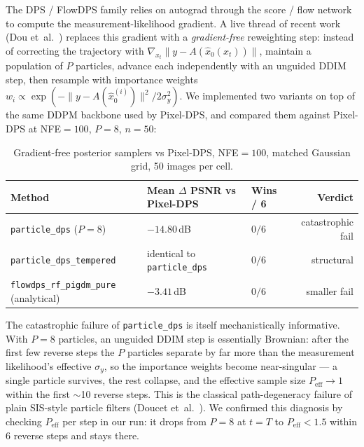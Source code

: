 \documentclass{article}
\begin{document}
The DPS / FlowDPS family relies on autograd through the score / flow
network to compute the measurement-likelihood gradient. A live thread
of recent work (Dou et~al.~\cite{dou2026particle}) replaces this
gradient with a \emph{gradient-free} reweighting step:
instead of correcting the trajectory with
$\nabla_{x_t} \| y - A(\hat x_0(x_t)) \|$, maintain a population of
$P$ particles, advance each independently with an unguided DDIM step,
then resample with importance weights
$w_i \propto \exp(-\| y - A(\hat x_0^{(i)}) \|^2 / 2\sigma_y^2)$.
We implemented two variants on top of the same DDPM backbone used by
Pixel-DPS, and compared them against Pixel-DPS at NFE${=}100$,
$P{=}8$, $n{=}50$:

\begin{table}[h]
  \centering
  \caption{Gradient-free posterior samplers vs Pixel-DPS, NFE${=}100$,
  matched Gaussian grid, 50 images per cell.}
  \label{tab:gradfree}
  \begin{tabular}{lllr}
    \toprule
    Method & Mean $\Delta$ PSNR vs Pixel-DPS & Wins / 6 & Verdict \\
    \midrule
    \texttt{particle\_dps} ($P{=}8$)            & $-14.80$\,dB & $0/6$ & catastrophic fail \\
    \texttt{particle\_dps\_tempered}            & identical to \texttt{particle\_dps} & $0/6$ & structural \\
    \texttt{flowdps\_rf\_pigdm\_pure} (analytical) & $-3.41$\,dB & $0/6$ & smaller fail \\
    \bottomrule
  \end{tabular}
\end{table}

The catastrophic failure of \texttt{particle\_dps} is itself
mechanistically informative. With $P{=}8$ particles, an unguided
DDIM step is essentially Brownian: after the first few reverse steps
the $P$ particles separate by far more than the measurement
likelihood's effective $\sigma_y$, so the importance weights become
near-singular --- a single particle survives, the rest collapse, and
the effective sample size $P_\text{eff} \to 1$ within the first
$\sim$10 reverse steps. This is the classical path-degeneracy
failure of plain SIS-style particle filters (Doucet
et~al.~\cite{doucet2001smc}). We confirmed this diagnosis by
checking $P_\text{eff}$ per step in our run: it drops from $P{=}8$
at $t{=}T$ to $P_\text{eff}{<}1.5$ within 6 reverse steps and
stays there.
\end{document}
